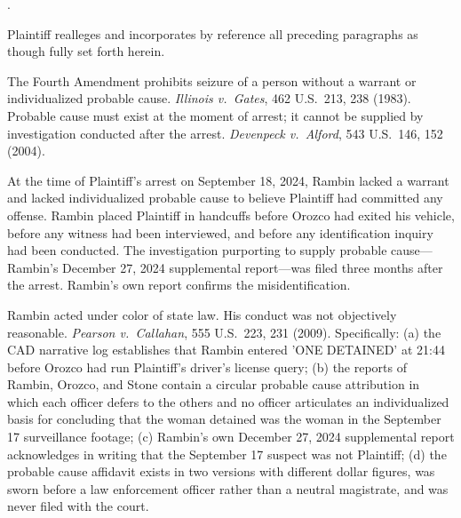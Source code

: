 \documentclass[12pt,letterpaper]{article}
\newcounter{complaintpara}
\newenvironment{paras}{%
	\begin{list}{\arabic{complaintpara}.}{%
			\setlength{\leftmargin}{0.5in}%
			\setlength{\labelwidth}{0.4in}%
			\setlength{\labelsep}{0.1in}%
			\setlength{\itemsep}{0pt}%
			\setlength{\parsep}{0pt}%
			\setlength{\topsep}{6pt}%
		}%
	}{%
	\end{list}%
}
\begin{document}
	\begin{paras}
		
		\item Plaintiff realleges and incorporates by reference all
		preceding paragraphs as though fully set forth herein.
		
		\item The Fourth Amendment prohibits seizure of a person without
		a warrant or individualized probable cause.
		\textit{Illinois v.\ Gates}, 462 U.S.\ 213, 238 (1983).
		Probable cause must exist at the moment of arrest; it cannot
		be supplied by investigation conducted after the arrest.
		\textit{Devenpeck v.\ Alford}, 543 U.S.\ 146, 152 (2004).
		
		\item At the time of Plaintiff's arrest on September 18, 2024,
		Rambin lacked a warrant and lacked individualized probable
		cause to believe Plaintiff had committed any offense. Rambin
		placed Plaintiff in handcuffs before Orozco had exited his
		vehicle, before any witness had been interviewed, and before
		any identification inquiry had been conducted. The
		investigation purporting to supply probable cause---Rambin's
		December 27, 2024 supplemental report---was filed three months
		after the arrest. Rambin's own report confirms the
		misidentification.
		
		\item Rambin acted under color of state law. His conduct was not
		objectively reasonable. \textit{Pearson v.\ Callahan}, 555 U.S.\ 223, 231 (2009). Specifically: (a) the CAD narrative log establishes that Rambin entered 'ONE DETAINED' at 21:44 before Orozco had run Plaintiff's driver's license query; (b) the reports of Rambin, Orozco, and Stone contain a circular probable cause attribution in which each officer defers to the others and no officer articulates an individualized basis for concluding that the woman detained was the woman in the September 17 surveillance footage; (c) Rambin's own December 27, 2024 supplemental report acknowledges in writing that the September 17 suspect was not Plaintiff; (d) the probable cause affidavit exists in two versions with different dollar figures, was sworn before a law enforcement officer rather than a neutral magistrate, and was never filed with the court.
		

\end{paras}
\end{document}
